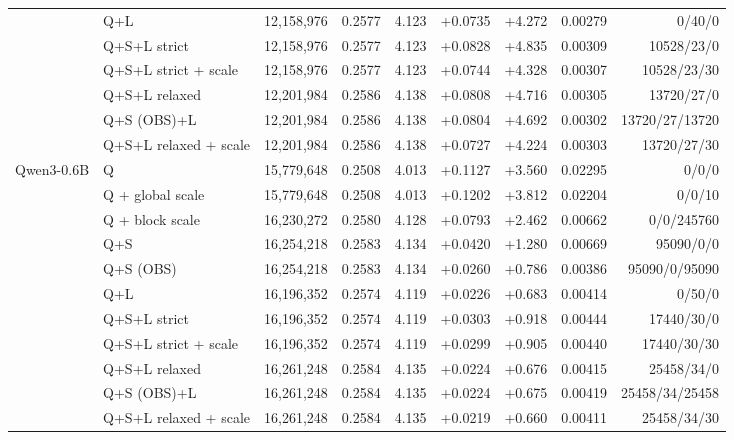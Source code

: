 \begin{table}[t]
{\begin{tabular}{llrrrrrrr}
 & Q+L & 12,158,976 & 0.2577 & 4.123 & +0.0735 & +4.272 & 0.00279 & 0/40/0 \\
 & Q+S+L strict & 12,158,976 & 0.2577 & 4.123 & +0.0828 & +4.835 & 0.00309 & 10528/23/0 \\
 & Q+S+L strict + scale & 12,158,976 & 0.2577 & 4.123 & +0.0744 & +4.328 & 0.00307 & 10528/23/30 \\
 & Q+S+L relaxed & 12,201,984 & 0.2586 & 4.138 & +0.0808 & +4.716 & 0.00305 & 13720/27/0 \\
 & Q+S (OBS)+L & 12,201,984 & 0.2586 & 4.138 & +0.0804 & +4.692 & 0.00302 & 13720/27/13720 \\
 & Q+S+L relaxed + scale & 12,201,984 & 0.2586 & 4.138 & +0.0727 & +4.224 & 0.00303 & 13720/27/30 \\
\addlinespace
Qwen3-0.6B & Q & 15,779,648 & 0.2508 & 4.013 & +0.1127 & +3.560 & 0.02295 & 0/0/0 \\
 & Q + global scale & 15,779,648 & 0.2508 & 4.013 & +0.1202 & +3.812 & 0.02204 & 0/0/10 \\
 & Q + block scale & 16,230,272 & 0.2580 & 4.128 & +0.0793 & +2.462 & 0.00662 & 0/0/245760 \\
 & Q+S & 16,254,218 & 0.2583 & 4.134 & +0.0420 & +1.280 & 0.00669 & 95090/0/0 \\
 & Q+S (OBS) & 16,254,218 & 0.2583 & 4.134 & +0.0260 & +0.786 & 0.00386 & 95090/0/95090 \\
 & Q+L & 16,196,352 & 0.2574 & 4.119 & +0.0226 & +0.683 & 0.00414 & 0/50/0 \\
 & Q+S+L strict & 16,196,352 & 0.2574 & 4.119 & +0.0303 & +0.918 & 0.00444 & 17440/30/0 \\
 & Q+S+L strict + scale & 16,196,352 & 0.2574 & 4.119 & +0.0299 & +0.905 & 0.00440 & 17440/30/30 \\
 & Q+S+L relaxed & 16,261,248 & 0.2584 & 4.135 & +0.0224 & +0.676 & 0.00415 & 25458/34/0 \\
 & Q+S (OBS)+L & 16,261,248 & 0.2584 & 4.135 & +0.0224 & +0.675 & 0.00419 & 25458/34/25458 \\
 & Q+S+L relaxed + scale & 16,261,248 & 0.2584 & 4.135 & +0.0219 & +0.660 & 0.00411 & 25458/34/30 \\
\bottomrule
\end{tabular}%
}
\end{table}
